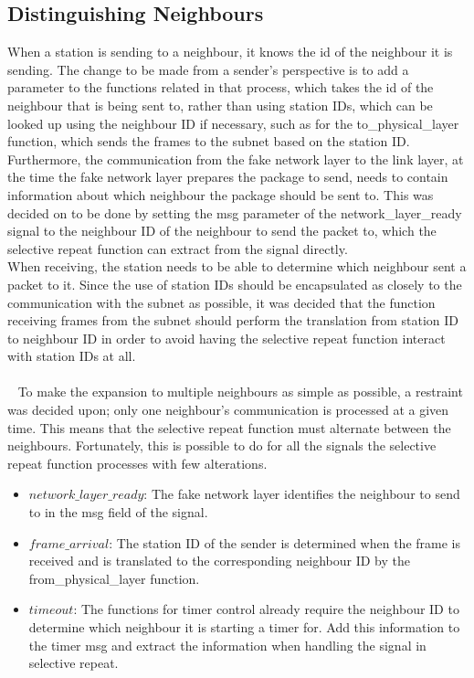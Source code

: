 \subsection{Distinguishing Neighbours}
When a station is sending to a neighbour, it knows the id of the neighbour it is sending. The change to be made from a sender's perspective is to add a parameter to the functions related in that process, which takes the id of the neighbour that is being sent to, rather than using station IDs, which can be looked up using the neighbour ID if necessary, such as for the to\_physical\_layer function, which sends the frames to the subnet based on the station ID. Furthermore, the communication from the fake network layer to the link layer, at the time the fake network layer prepares the package to send, needs to contain information about which neighbour the package should be sent to. This was decided on to be done by setting the msg parameter of the network\_layer\_ready signal to the neighbour ID of the neighbour to send the packet to, which the selective repeat function can extract from the signal directly.\\
When receiving, the station needs to be able to determine which neighbour sent a packet to it. Since the use of station IDs should be encapsulated as closely to the communication with the subnet as possible, it was decided that the function receiving frames from the subnet should perform the translation from station ID to neighbour ID in order to avoid having the selective repeat function interact with station IDs at all.\\
\\~
To make the expansion to multiple neighbours as simple as possible, a restraint was decided upon; only one neighbour's communication is processed at a given time. This means that the selective repeat function must alternate between the neighbours. Fortunately, this is possible to do for all the signals the selective repeat function processes with few alterations.
\begin{itemize}
  \item $network\_layer\_ready$: The fake network layer identifies the neighbour to send to in the msg field of the signal.
  \item $frame\_arrival$: The station ID of the sender is determined when the frame is received and is translated to the corresponding neighbour ID by the from\_physical\_layer function. %
  \item $timeout$: The functions for timer control already require the neighbour ID to determine which neighbour it is starting a timer for. Add this information to the timer msg and extract the information when handling the signal in selective repeat.
\end{itemize}

